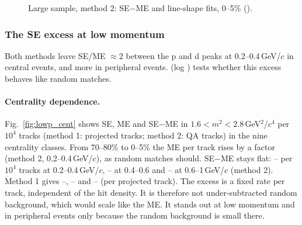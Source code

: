 \begin{figure}[H]
\centering
{}
\caption{Large sample, method 2: SE$-$ME and line-shape fits, 0--5\% ().}
\end{figure}



\subsubsection{The SE excess at low momentum}
\label{sec:lowp}
Both methods leave SE/ME $\approx2$ between the p and d peaks at 0.2--0.4\,GeV/$c$ in central events, and more in peripheral events.
 (log ) tests whether this excess behaves like random matches.

\paragraph{Centrality dependence.} Fig.~\ref{fig:lowp_cent} shows SE, ME and SE$-$ME in $1.6<m^2<2.8$\,GeV$^2$/$c^4$ per $10^4$
tracks (method 1: projected tracks; method 2: QA tracks) in the nine centrality classes. From 70--80\% to 0--5\% the ME per track rises
by a factor \lowpTwoAMErat{} (method 2, 0.2--0.4\,GeV/$c$), as random matches should. SE$-$ME stays flat:
\lowpTwoADmin--\lowpTwoADmax{} per $10^4$ tracks at 0.2--0.4\,GeV/$c$, \lowpTwoBDmin--\lowpTwoBDmax{} at 0.4--0.6 and
\lowpTwoCDmin--\lowpTwoCDmax{} at 0.6--1\,GeV/$c$ (method 2). Method 1 gives \lowpOneADmin--\lowpOneADmax,
\lowpOneBDmin--\lowpOneBDmax{} and \lowpOneCDmin--\lowpOneCDmax{} (per projected track). The excess is a fixed rate per track,
independent of the hit density. It is therefore not under-subtracted random background, which would scale like the ME. It stands
out at low momentum and in peripheral events only because the random background is small there.

